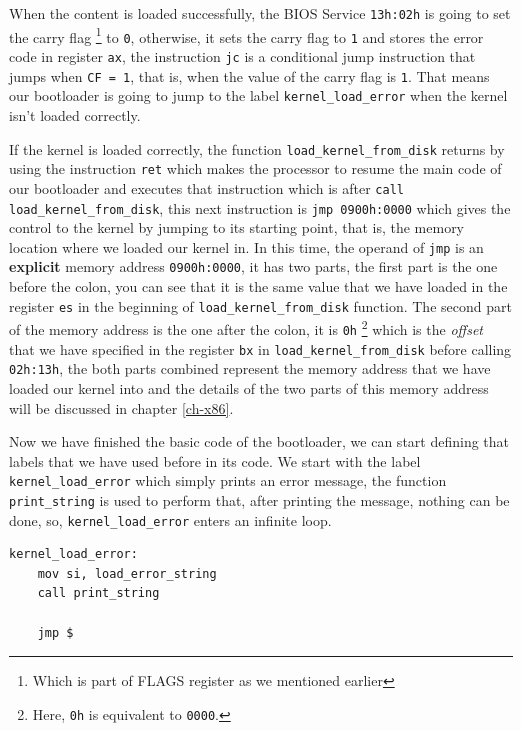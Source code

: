 When the content is loaded successfully, the BIOS Service
\lstinline!13h:02h! is going to set the carry flag \footnote{Which is
  part of FLAGS register as we mentioned earlier} to \lstinline!0!,
otherwise, it sets the carry flag to \lstinline!1! and stores the error
code in register \lstinline!ax!, the instruction \lstinline!jc! is a
conditional jump instruction that jumps when \lstinline!CF = 1!, that
is, when the value of the carry flag is \lstinline!1!. That means our
bootloader is going to jump to the label \lstinline!kernel_load_error!
when the kernel isn't loaded correctly.

If the kernel is loaded correctly, the function
\lstinline!load_kernel_from_disk! returns by using the instruction
\lstinline!ret! which makes the processor to resume the main code of our
bootloader and executes that instruction which is after
\lstinline!call load_kernel_from_disk!, this next instruction is
\lstinline!jmp 0900h:0000! which gives the control to the kernel by
jumping to its starting point, that is, the memory location where we
loaded our kernel in. In this time, the operand of \lstinline!jmp! is an
\textbf{explicit} memory address \lstinline!0900h:0000!, it has two
parts, the first part is the one before the colon, you can see that it
is the same value that we have loaded in the register \lstinline!es! in
the beginning of \lstinline!load_kernel_from_disk! function. The second
part of the memory address is the one after the colon, it is
\lstinline!0h! \footnote{Here, \lstinline!0h! is equivalent to
  \lstinline!0000!.} which is the \emph{offset} that we have specified
in the register \lstinline!bx! in \lstinline!load_kernel_from_disk!
before calling \lstinline!02h:13h!, the both parts combined represent
the memory address that we have loaded our kernel into and the details
of the two parts of this memory address will be discussed in chapter
\ref{ch-x86}.

Now we have finished the basic code of the bootloader, we can start
defining that labels that we have used before in its code. We start with
the label \lstinline!kernel_load_error! which simply prints an error
message, the function \lstinline!print_string! is used to perform that,
after printing the message, nothing can be done, so,
\lstinline!kernel_load_error! enters an infinite loop.

\begin{lstlisting}
kernel_load_error:
    mov si, load_error_string
    call print_string
    
    jmp $
\end{lstlisting}

